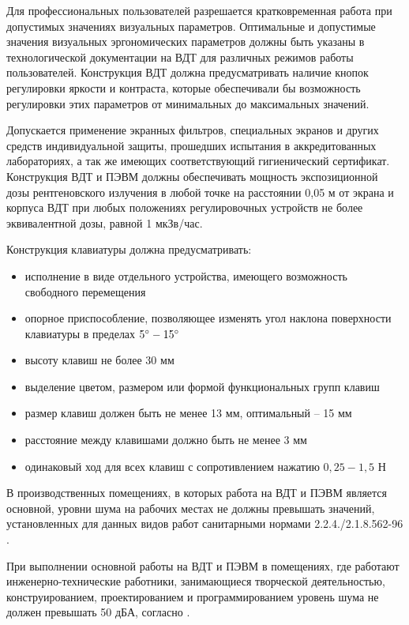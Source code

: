 Для профессиональных пользователей разрешается кратковременная работа при допустимых
значениях визуальных параметров. Оптимальные и допустимые значения визуальных
эргономических параметров должны быть указаны в технологической документации на
ВДТ для различных режимов работы пользователей. Конструкция ВДТ должна предусматривать
наличие кнопок регулировки яркости и контраста, которые обеспечивали бы возможность
регулировки этих параметров от минимальных до максимальных значений.

Допускается применение экранных фильтров, специальных экранов и других средств
индивидуальной защиты, прошедших испытания в аккредитованных лабораториях, а так
же имеющих соответствующий гигиенический сертификат. Конструкция ВДТ и ПЭВМ должны
обеспечивать мощность экспозиционной дозы рентгеновского излучения в любой точке
на расстоянии 0,05 м от экрана и корпуса ВДТ при любых положениях регулировочных
устройств не более эквивалентной дозы, равной 1 мкЗв/час.

Конструкция клавиатуры должна предусматривать:

\begin{itemize}
    \item исполнение в виде отдельного устройства, имеющего возможность свободного
            перемещения
    \item опорное приспособление, позволяющее изменять угол наклона поверхности
            клавиатуры в пределах $5 \degree - 15 \degree$
    \item высоту клавиш не более 30 мм
    \item выделение цветом, размером или формой функциональных групп клавиш
    \item размер клавиш должен быть не менее 13 мм, оптимальный – 15 мм
    \item расстояние между клавишами должно быть не менее 3 мм
    \item одинаковый ход для всех клавиш с сопротивлением нажатию $0,25 - 1,5$ Н
\end{itemize}


В производственных помещениях, в которых работа на ВДТ и ПЭВМ является основной,
уровни шума на рабочих местах не должны превышать значений, установленных для
данных видов работ санитарными нормами 2.2.4./2.1.8.562-96
\cite{ecology_sanitary_norm_562_96}.

При выполнении основной работы на ВДТ и ПЭВМ в помещениях, где работают
инженерно-технические работники, занимающиеся творческой деятельностью, конструированием,
проектированием и программированием уровень шума не должен превышать 50 дБА,
согласно \cite[табл. 2]{ecology_sanitary_norm_562_96}.

